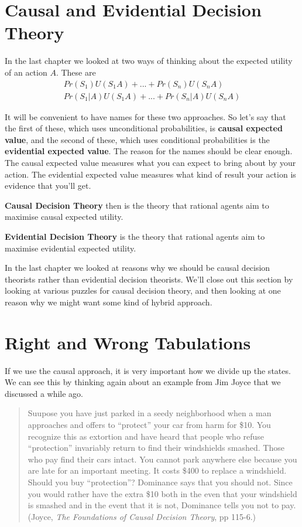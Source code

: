 \section{Causal and Evidential Decision Theory}
In the last chapter we looked at two ways of thinking about the expected utility of an action $A$. These are \begin{align*}
Pr(S_1)U(S_1A) + ...  + Pr(S_n)U(S_nA) \\
Pr(S_1|A)U(S_1A) + ...  + Pr(S_n|A)U(S_nA)
\end{align*}

\noindent It will be convenient to have names for these two approaches. So let's say that the first of these, which uses unconditional probabilities, is \textbf{causal expected value}, and the second of these, which uses conditional probabilities is the \textbf{evidential expected value}. The reason for the names should be clear enough. The causal expected value measures what you can expect to bring about by your action. The evidential expected value measures what kind of result your action is evidence that you'll get.

\textbf{Causal Decision Theory} then is the theory that rational agents aim to maximise causal expected utility.

\textbf{Evidential Decision Theory} is the theory that rational agents aim to maximise evidential expected utility.

In the last chapter we looked at reasons why we should be causal decision theorists rather than evidential decision theorists. We'll close out this section by looking at various puzzles for causal decision theory, and then looking at one reason why we might want some kind of hybrid approach.

\section{Right and Wrong Tabulations}
If we use the causal approach, it is very important how we divide up the states. We can see this by thinking again about an example from Jim Joyce that we discussed a while ago.

\begin{quotation}
Suupose you have just parked in a seedy neighborhood when a man approaches and offers to ``protect'' your car from harm for \$10. You recognize this as extortion and have heard that people who refuse ``protection'' invariably return to find their windshields smashed. Those who pay find their cars intact. You cannot park anywhere else because you are late for an important meeting. It costs \$400 to replace a windshield. Should you buy ``protection''? Dominance says that you should not. Since you would rather have the extra \$10 both in the even that your windshield is smashed and in the event that it is not, Dominance tells you not to pay. (Joyce, \textit{The Foundations of Causal Decision Theory}, pp 115-6.)
\end{quotation}

